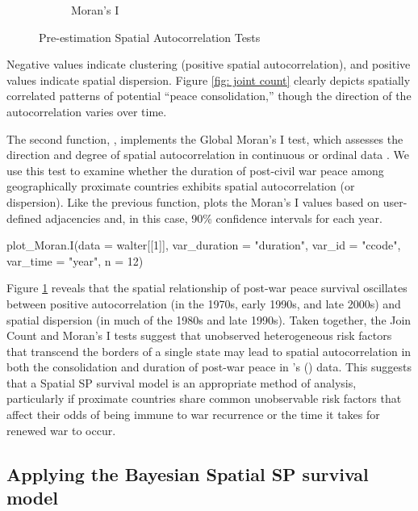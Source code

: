 \begin{figure}[!htb]
\begin{subfigure}[b]{0.487\textwidth}
         \caption{Moran's I}
         \label{fig:moran's.I}
     \end{subfigure}
     \hfill
     \caption{Pre-estimation Spatial Autocorrelation Tests}
        \label{figure1: pre-estimation tests}
\end{figure}


\noindent Negative values indicate clustering (positive spatial autocorrelation), and positive values indicate spatial dispersion. Figure \ref{fig: joint count} clearly depicts spatially correlated patterns of potential “peace consolidation,” though the direction of the autocorrelation varies over time.

The second function, , implements the Global Moran’s I test, which assesses the direction and degree of spatial autocorrelation in continuous or ordinal data \citep{moran1950notes,ape}. We use this test to examine whether the duration of post-civil war peace among geographically proximate countries exhibits spatial autocorrelation (or dispersion). Like the previous function,  plots the Moran’s I values based on user-defined adjacencies and, in this case, 90\% confidence intervals for each year. 

\begin{example}
plot_Moran.I(data = walter[[1]], var_duration = "duration", var_id = "ccode",
            var_time = "year", n = 12)
\end{example}

\noindent Figure \ref{fig:moran's.I} reveals that the spatial relationship of post-war peace survival oscillates between positive autocorrelation (in the 1970s, early 1990s, and late 2000s) and spatial dispersion (in much of the 1980s and late 1990s). Taken together, the Join Count and Moran’s I tests suggest that unobserved heterogeneous risk factors that transcend the borders of a single state may lead to spatial autocorrelation in both the consolidation and duration of post-war peace in \citeauthor{walter2015bad}'s (\citeyear{walter2015bad}) data. This suggests that a Spatial SP survival model is an appropriate method of analysis, particularly if proximate countries share common unobservable risk factors that affect their odds of being immune to war recurrence or the time it takes for renewed war to occur. 

\subsection {Applying the Bayesian Spatial SP survival model}

